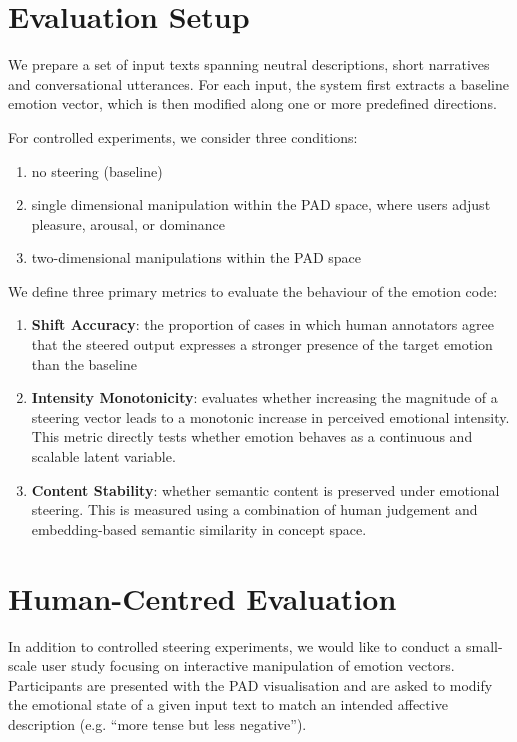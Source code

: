 \documentclass[12pt,twoside]{report}
\begin{document}
\section{Evaluation Setup}

We prepare a set of input texts spanning neutral descriptions, short narratives and conversational utterances. For each input, the system first extracts a baseline emotion vector, which is then modified along one or more predefined directions.

For controlled experiments, we consider three conditions:
\begin{enumerate}
    \item no steering (baseline)
    \item single dimensional manipulation within the PAD space, where users adjust pleasure, arousal, or dominance
    \item two-dimensional manipulations within the PAD space
\end{enumerate}

We define three primary metrics to evaluate the behaviour of the emotion code:
\begin{enumerate}
    \item \textbf{Shift Accuracy}: the proportion of cases in which human annotators agree that the steered output expresses a stronger presence of the target emotion than the baseline
    \item \textbf{Intensity Monotonicity}: evaluates whether increasing the magnitude of a steering vector leads to a monotonic increase in perceived emotional intensity. This metric directly tests whether emotion behaves as a continuous and scalable latent variable.
    \item \textbf{Content Stability}: whether semantic content is preserved under emotional steering. This is measured using a combination of human judgement and embedding-based semantic similarity in concept space.
\end{enumerate}

\section{Human-Centred Evaluation}

In addition to controlled steering experiments, we would like to conduct a small-scale user study focusing on interactive manipulation of emotion vectors. Participants are presented with the PAD visualisation and are asked to modify the emotional state of a given input text to match an intended affective description (e.g. ``more tense but less negative'').
\end{document}
